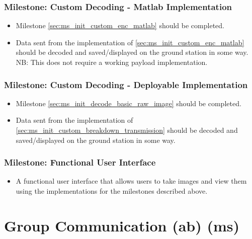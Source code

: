 	\subsubsection{Milestone: Custom Decoding - Matlab Implementation}
		\begin{itemize}
			\item 	Milestone \ref{sec:ms_init_custom_enc_matlab} should be completed.
			\item 	Data sent from the implementation of \ref{sec:ms_init_custom_enc_matlab} should be
				decoded and saved/displayed on the ground station in some way. NB: This does not require
				a working payload implementation.
		\end{itemize}

	\subsubsection{Milestone: Custom Decoding - Deployable Implementation}
		\begin{itemize}
			\item 	Milestone \ref{sec:ms_init_decode_basic_raw_image} should be completed.
			\item 	Data sent from the implementation of \ref{sec:ms_init_custom_breakdown_transmission} should be
				decoded and saved/displayed on the ground station in some way.
		\end{itemize}

	\subsubsection{Milestone: Functional User Interface}
		\begin{itemize}
			\item 	A functional user interface that allows users to take images and view them using the implementations
				for the milestones described above.
		\end{itemize}








\section{Group Communication (ab) (ms)}
\label{group_comms}

